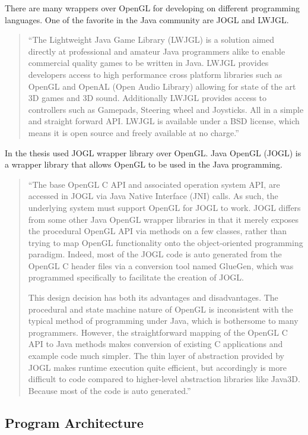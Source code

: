 There are many wrappers over OpenGL for developing on different programming languages.
One of the favorite in the Java community are JOGL and LWJGL.

\begin{quotation}
``The Lightweight Java Game Library (LWJGL) is a solution aimed directly at professional and amateur Java programmers
alike to enable commercial quality games to be written in Java. LWJGL provides developers access to
high performance cross platform libraries such as OpenGL and OpenAL (Open Audio Library) allowing for state of the art
3D games and 3D sound. Additionally LWJGL provides access to controllers such as Gamepads, Steering wheel and Joysticks.
All in a simple and straight forward API.
LWJGL is available under a BSD license, which means it is open source and freely available at no charge.''~\cite{LWJGL}
\end{quotation}


In the thesis used JOGL wrapper library over OpenGL. Java OpenGL (JOGL) is a wrapper library that allows OpenGL to be used in the Java programming.

\begin{quotation}
``The base OpenGL C API and associated operation system API, are accessed in JOGL via Java Native Interface (JNI) calls.
As such, the underlying system must support OpenGL for JOGL to work.
JOGL differs from some other Java OpenGL wrapper libraries in that it merely exposes the procedural OpenGL API
via methods on a few classes, rather than trying to map OpenGL functionality onto the object-oriented programming paradigm.
Indeed, most of the JOGL code is auto generated from the OpenGL C header files via a conversion tool named GlueGen,
which was programmed specifically to facilitate the creation of JOGL.

This design decision has both its advantages and disadvantages.
The procedural and state machine nature of OpenGL is inconsistent with the typical method of programming under Java,
which is bothersome to many programmers. However, the straightforward mapping of the OpenGL C API to Java methods
makes conversion of existing C applications and example code much simpler.
The thin layer of abstraction provided by JOGL makes runtime execution quite efficient,
but accordingly is more difficult to code compared to higher-level abstraction libraries like Java3D.
Because most of the code is auto generated.''~\cite{JOGL}
\end{quotation}


\subsection{Program Architecture}

